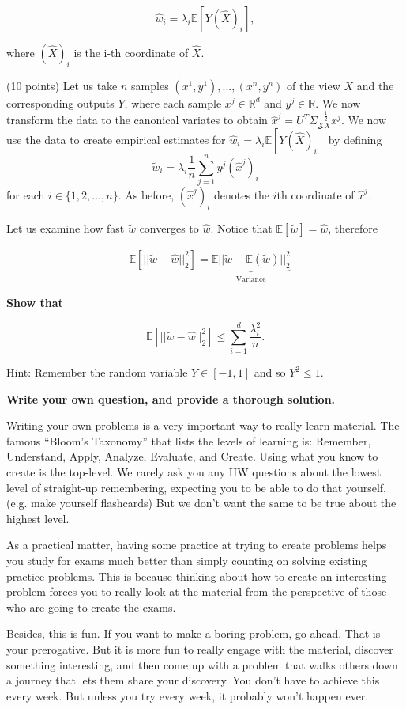 \begin{Parts}
$$ \hat{w}_i = \lambda_i \mathbb{E}[Y(\hat{X})_i],$$

where $(\hat{X})_i$ is the i-th coordinate of $\hat{X}$.




\examblank

\Part (10 points) Let us take $n$ samples $(x^1,y^1),...,(x^n,y^n)$ of the view
$X$ and the corresponding outputs $Y$, where each sample $x^j \in
\mathbb{R}^d$ and $y^j \in \mathbb{R}$. We now transform the data to the
canonical variates to obtain $\hat{x}^j =
U^T\Sigma_{XX}^{-\frac{1}{2}} x^j$. We now use the data to create
empirical estimates for $\hat{w}_i = \lambda_i \mathbb{E}[Y (\hat{X})_i]$ by defining $$\tilde{w}_i = \lambda_i \frac{1}{n}
\sum_{j=1}^n y^j (\hat{x}^j)_i$$ for each $i \in \{1, 2, \ldots, n\}$. As before, $(\hat{x}^j)_i$ denotes the $i$th coordinate of $\hat{x}^j$.

Let us examine how fast $\tilde{w}$ converges to $\hat{w}$. Notice that $\mathbb{E}[\tilde{w}] = \hat{w}$, therefore 

\begin{align*}
&\mathbb{E}[||\tilde{w} - \hat{w}||^2_2] = \underbrace{\mathbb{E}||\tilde{w}- \mathbb{E}(\tilde{w})||^2_2}_{\text{Variance}}
\end{align*}


{\bf Show that} 

$$ \mathbb{E}[||\tilde{w} - \hat{w}||^2_2] \leq \sum_{i=1}^d \frac{\lambda_i^2}{n}. $$ 

Hint: Remember the random variable $Y \in [-1,1]$ and so $Y^2 \leq 1$.





\end{Parts}


{\bf Write your own question, and provide a thorough solution.}

Writing your own problems is a very important way to really learn
material. The famous ``Bloom's Taxonomy'' that lists the levels of
learning is: Remember, Understand, Apply, Analyze, Evaluate, and
Create. Using what you know to create is the top-level. We rarely ask
you any HW questions about the lowest level of straight-up
remembering, expecting you to be able to do that yourself. (e.g. make
yourself flashcards) But we don't want the same to be true about the
highest level.

As a practical matter, having some practice at trying to create
problems helps you study for exams much better than simply counting on
solving existing practice problems. This is because thinking about how
to create an interesting problem forces you to really look at the
material from the perspective of those who are going to create the
exams. 

Besides, this is fun. If you want to make a boring problem, go
ahead. That is your prerogative. But it is more fun to really engage
with the material, discover something interesting, and then come up
with a problem that walks others down a journey that lets them share
your discovery. You don't have to achieve this every week. But unless
you try every week, it probably won't happen ever. 
